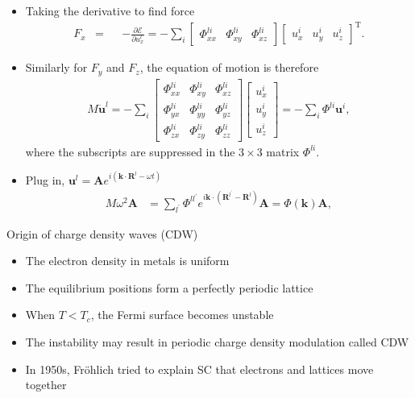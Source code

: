 \documentclass{beamer}
\newcommand*\vf[1]{\mathbf{#1}}
\begin{document}
\begin{frame}{}
\begin{itemize}
\item Taking the derivative to find force
\begin{align*}
F_x &=&&-\frac{\partial \mathcal{E}}{\partial u_x^l} = -\sum_i
\begin{bmatrix}
\Phi_{xx}^{li} & \Phi_{xy}^{li} & \Phi_{xz}^{li}
\end{bmatrix}
\begin{bmatrix}
u_x^i & u_y^i & u_z^i
\end{bmatrix}^\text{T}.
\end{align*}
\item Similarly for $F_y$ and $F_z$, the equation of motion is therefore
\begin{align}
\boxed{M \ddot{\vf{u}}^l = -\sum_i
\begin{bmatrix}
\Phi_{xx}^{li} & \Phi_{xy}^{li} & \Phi_{xz}^{li} \\
\Phi_{yx}^{li} & \Phi_{yy}^{li} & \Phi_{yz}^{li} \\
\Phi_{zx}^{li} & \Phi_{zy}^{li} & \Phi_{zz}^{li}
\end{bmatrix}
\begin{bmatrix}
u_x^i \\
u_y^i \\
u_z^i
\end{bmatrix} = -\sum_i \Phi^{li} \vf{u}^i}, \label{eq:phonon_motion}
\end{align}
where the subscripts are suppressed in the $3 \times 3$ matrix $\Phi^{li}$.
\item Plug in, $\vf{u}^l = \vf{A} e^{i (\vf{k} \cdot \vf{R}^l - \omega t)}$
\begin{align}
M \omega^2 \vf{A} &= \sum_{l^{\prime}} \Phi^{l l^{\prime}} e^{i \vf{k} \cdot (\vf{R}^{l^{\prime}} - \vf{R}^l)} \vf{A} = \Phi(\vf{k}) \vf{A}, \label{eq:phonon_motion_matrix}
\end{align}
\end{itemize}
\end{frame}

\begin{frame}{Origin of charge density waves (CDW)}
\begin{itemize}
\item The electron density in metals is uniform
\item The equilibrium positions form a perfectly periodic lattice
\item When $T < T_c$, the Fermi surface becomes unstable
\item The instability may result in periodic charge density modulation called CDW
\item In 1950s, Fr\"{o}hlich tried to explain SC that electrons and lattices move together
\end{itemize}
\end{frame}
\end{document}

